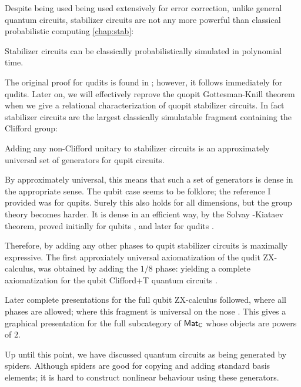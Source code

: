 Despite being used being used extensively for error correction, unlike general quantum circuits, stabilizer circuits are not any more powerful than classical probabilistic computing \ref{chap:stab}:
\begin{theorem}
Stabilizer circuits can be classically probabilistically  simulated in polynomial time.
\end{theorem}
The original proof for qudits is found in  \cite{gottesmanknill}; however, it follows immediately for qudits.  Later on, we will effectively reprove the quopit Gottesman-Knill theorem when we give a relational characterization of quopit stabilizer circuits.  In fact stabilizer circuits are the largest classically simulatable fragment containing the Clifford group:
\begin{proposition}
\label{prop:campbell}
Adding any non-Clifford unitary to stabilizer circuits is an approximately universal set of generators for qupit  circuits.
\end{proposition}
By approximately universal, this means that such a set of generators is dense in the appropriate sense.
The qubit case seems to be folklore; the reference I provided was for qupits.  Surely this also holds for all dimensions, but the group theory becomes harder.  It is dense in an efficient way, by the Solvay -Kiataev theorem, proved initially for qubits  \cite{Kitaev1997}, and later for qudits \cite[\S 5]{Dawson2006}.

Therefore, by adding any other phases to qupit stabilizer circuits is maximally expressive.  The first approxiately universal axiomatization of the qudit ZX-calculus, was obtained by adding the $1/8$ phase: yielding a complete axiomatization for the qubit  Clifford+T quantum circuits \cite{Jeandel}.

Later complete presentations for the full qubit ZX-calculus followed,  where all phases are allowed; where this fragment is universal on the nose \cite{zxcompleteb,zxcompletea}.  This gives a graphical presentation for the full subcategory of $\mathsf{Mat}_{\mathbb{C}}$ whose objects are powers of $2$.


Up until this point, we have discussed quantum circuits as being generated by spiders. Although spiders are good for copying and adding standard basis elements; it is hard to construct nonlinear behaviour using these generators.

